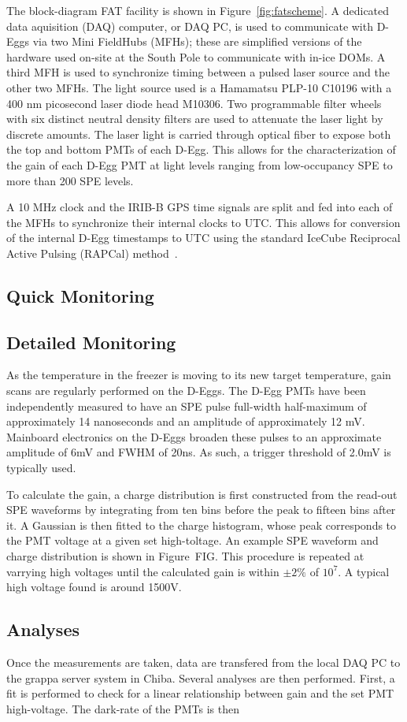 \documentclass[main.tex]{subfiles}
\begin{document}
The block-diagram FAT facility is shown in Figure~\ref{fig:fatscheme}. 
A dedicated data aquisition (DAQ) computer, or DAQ PC, is used to communicate with D-Eggs via two Mini FieldHubs (MFHs); these are simplified versions of the hardware used on-site at the South Pole to communicate with in-ice DOMs. 
A third MFH is used to synchronize timing between a pulsed laser source and the other two MFHs. 
The light source used is a Hamamatsu PLP-10 C10196 with a 400 nm picosecond laser diode head M10306.
Two programmable filter wheels with six distinct neutral density filters are used to attenuate the laser light by discrete amounts. 
The laser light is carried through optical fiber to expose both the top and bottom PMTs of each D-Egg.
This allows for the characterization of the gain of each D-Egg PMT at light levels ranging from low-occupancy SPE to more than 200 SPE levels. 

A 10 MHz clock and the IRIB-B GPS time signals are split and fed into each of the MFHs to synchronize their internal clocks to UTC.
This allows for conversion of the internal D-Egg timestamps to UTC using the standard IceCube Reciprocal Active Pulsing (RAPCal) method~\cite{ABBASI2009294}.


\subsection{Quick Monitoring}

\subsection{Detailed Monitoring}

As the temperature in the freezer is moving to its new target temperature, gain scans are regularly performed on the D-Eggs. 
The D-Egg PMTs have been independently measured to have an SPE pulse full-width half-maximum of approximately 14 nanoseconds and an amplitude of approximately 12 mV. 
Mainboard electronics on the D-Eggs broaden these pulses to an approximate amplitude of 6mV and FWHM of 20ns. 
As such, a trigger threshold of 2.0mV is typically used.

To calculate the gain, a charge distribution is first constructed from the read-out SPE waveforms by integrating from ten bins before the peak to fifteen bins after it.
A Gaussian is then fitted to the charge histogram, whose peak corresponds to the PMT voltage at a given set high-toltage. An example SPE waveform and charge distribution is shown in Figure~FIG.
This procedure is repeated at varrying high voltages until the calculated gain is within $\pm 2\%$ of $10^{7}$.
A typical high voltage found is around 1500V. 

\subsection{Analyses}

Once the measurements are taken, data are transfered from the local DAQ PC to the grappa server system in Chiba. Several analyses are then performed. 
First, a fit is performed to check for a linear relationship between gain and the set PMT high-voltage.  
The dark-rate of the PMTs is then 
\end{document}
